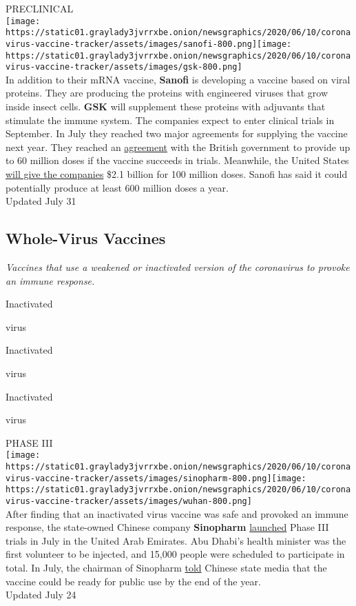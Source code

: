 PRECLINICAL\\
\texttt{[image: https://static01.graylady3jvrrxbe.onion/newsgraphics/2020/06/10/coronavirus-vaccine-tracker/assets/images/sanofi-800.png]}\texttt{[image: https://static01.graylady3jvrrxbe.onion/newsgraphics/2020/06/10/coronavirus-vaccine-tracker/assets/images/gsk-800.png]}\\
In addition to their mRNA vaccine, \textbf{Sanofi} is developing a
vaccine based on viral proteins. They are producing the proteins with
engineered viruses that grow inside insect cells. \textbf{GSK} will
supplement these proteins with adjuvants that stimulate the immune
system. The companies expect to enter clinical trials in September. In
July they reached two major agreements for supplying the vaccine next
year. They reached an
\href{https://www.sanofi.com/en/media-room/press-releases/2020/2020-07-29-07-00-00}{agreement}
with the British government to provide up to 60 million doses if the
vaccine succeeds in trials. Meanwhile, the United States
\href{https://www.nytimes3xbfgragh.onion/2020/07/31/health/covid-19-vaccine-sanofi-gsk.html}{will
give the companies} \$2.1 billion for 100 million doses. Sanofi has said
it could potentially produce at least 600 million doses a year.\\
Updated July 31

\hypertarget{whole-virus-vaccines}{%
\subsection{\texorpdfstring{\textbf{Whole-Virus
Vaccines}}{Whole-Virus Vaccines}}\label{whole-virus-vaccines}}

\emph{Vaccines that use a weakened or inactivated version of the
coronavirus to provoke an immune response.}

Inactivated

virus

Inactivated

virus

Inactivated

virus

PHASE III\\
\texttt{[image: https://static01.graylady3jvrrxbe.onion/newsgraphics/2020/06/10/coronavirus-vaccine-tracker/assets/images/sinopharm-800.png]}\texttt{[image: https://static01.graylady3jvrrxbe.onion/newsgraphics/2020/06/10/coronavirus-vaccine-tracker/assets/images/wuhan-800.png]}\\
After finding that an inactivated virus vaccine was safe and provoked an
immune response, the state-owned Chinese company \textbf{Sinopharm}
\href{https://www.thenational.ae/world/coronavirus-live-uk-accuses-russia-of-trying-to-steal-vaccine-research-1.1042256}{launched}
Phase III trials in July in the United Arab Emirates. Abu Dhabi's health
minister was the first volunteer to be injected, and 15,000 people were
scheduled to participate in total. In July, the chairman of Sinopharm
\href{https://www.reuters.com/article/us-health-coronavirus-vaccine-china/chinas-sinopharm-says-coronavirus-vaccine-could-be-ready-by-year-end-state-media-idUSKCN24O0PM}{told}
Chinese state media that the vaccine could be ready for public use by
the end of the year.\\
Updated July 24

